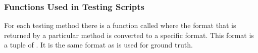     




        




            


\subsubsection*{Functions Used in Testing Scripts}

For each testing method there is a function called  where the format that is returned by a particular method is converted to a specific format. This format is a tuple of . It is the same format as is used for ground truth.

